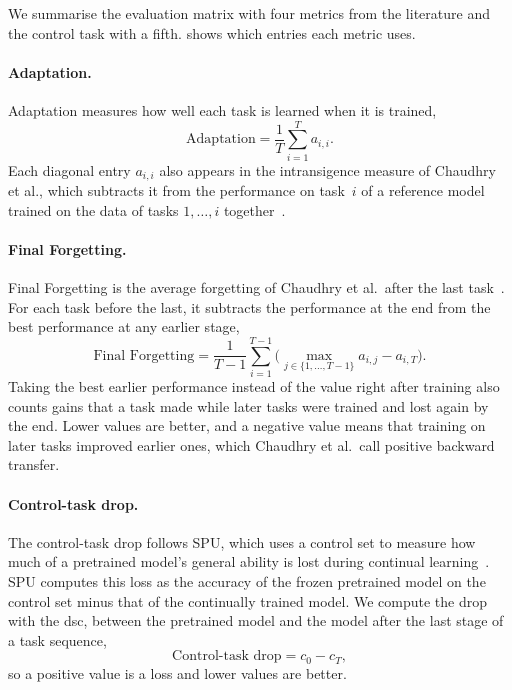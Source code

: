 We summarise the evaluation matrix with four metrics from the literature and the control task with a fifth.
 shows which entries each metric uses.

\paragraph{Adaptation.}
Adaptation measures how well each task is learned when it is trained,
\begin{equation}
\text{Adaptation} = \frac{1}{T} \sum_{i=1}^{T} a_{i,i}.
\label{eq:bg-adaptation}
\end{equation}
Each diagonal entry $a_{i,i}$ also appears in the intransigence measure of Chaudhry et al., which subtracts it from the performance on task~$i$ of a reference model trained on the data of tasks $1, \dots, i$ together~\cite[Sec.~3, Eq.~4]{Chaudhry_2018}.

\paragraph{Final Forgetting.}
Final Forgetting is the average forgetting of Chaudhry et al.\ after the last task~\cite[Sec.~3, Eq.~3]{Chaudhry_2018}.
For each task before the last, it subtracts the performance at the end from the best performance at any earlier stage,
\begin{equation}
\text{Final Forgetting} = \frac{1}{T-1} \sum_{i=1}^{T-1} \Big( \max_{j \in \{1, \dots, T-1\}} a_{i,j} - a_{i,T} \Big).
\label{eq:bg-forgetting}
\end{equation}
Taking the best earlier performance instead of the value right after training also counts gains that a task made while later tasks were trained and lost again by the end.
Lower values are better, and a negative value means that training on later tasks improved earlier ones, which Chaudhry et al.\ call positive backward transfer.

\paragraph{Control-task drop.}
The control-task drop follows SPU, which uses a control set to measure how much of a pretrained model's general ability is lost during continual learning~\cite[Sec.~5.1, Eq.~6]{Zhang_2024_CVPR}.
SPU computes this loss as the accuracy of the frozen pretrained model on the control set minus that of the continually trained model.
We compute the drop with the \gls{dsc}, between the pretrained model and the model after the last stage of a task sequence,
\begin{equation}
\text{Control-task drop} = c_0 - c_T,
\label{eq:bg-control-drop}
\end{equation}
so a positive value is a loss and lower values are better.

